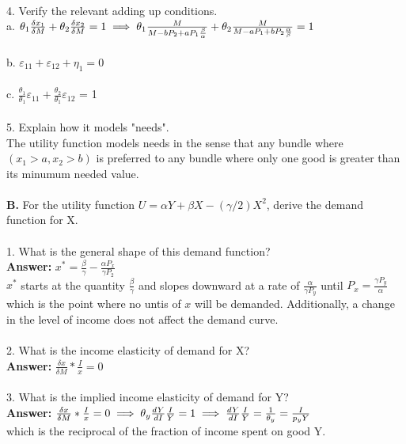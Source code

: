\documentclass[11pt]{article}
\begin{document}
\\
4. Verify the relevant adding up conditions.\\
a. $\theta_1\frac{\delta x_1}{\delta M} + \theta_2\frac{\delta x_2}{\delta M} = 1\\
\implies \theta_1\frac{M}{M - bP_2 + aP_1\frac{\beta}{\alpha}} + \theta_2\frac{M}{M - aP_1 + bP_2\frac{\alpha}{\beta}} = 1$\\
\\
b. $\varepsilon_11 + \varepsilon_12 + \eta_1 = 0$\\
\\
c. $\frac{\theta_1}{\theta_1}\varepsilon_11 + \frac{\theta_2}{\theta_1}\varepsilon_12$ = 1\\
\\
5. Explain how it models "needs".\\
The utility function models needs in the sense that any bundle where $(x_1 > a, x_2 > b)$ is preferred to any bundle where only one good is greater than its minumum needed value.\\
\\
\textbf{B. }For the utility function $U = \alpha Y + \beta X - (\gamma /2)X^2$, derive the demand function for X.\\
\\
1. What is the general shape of this demand function?\\
\textbf{Answer: } $x^* = \frac{\beta}{\gamma} - \frac{\alpha P_x}{\gamma P_2}$\\
$x^*$ starts at the quantity $\frac{\beta}{\gamma}$ and slopes downward at a rate of $\frac{\alpha}{\gamma P_y}$ until $P_x = \frac{\gamma P_y}{\alpha}$ which is the point where no untis of $x$ will be demanded. Additionally, a change in the level of income does not affect the demand curve.\\
\\
2. What is the income elasticity of demand for X?\\
\textbf{Answer: }$\frac{\delta x}{\delta M}*\frac{I}{x} = 0$\\
\\
3. What is the implied income elasticity of demand for Y?\\
\textbf{Answer: }$\frac{\delta x}{\delta M}*\frac{I}{x} = 0\\
\implies \theta_y\frac{dY}{dI}\frac{I}{Y} = 1\\
\implies \frac{dY}{dI}\frac{I}{Y} = \frac{1}{\theta_y} = \frac{I}{p_yY}$\\
which is the reciprocal of the fraction of income spent on good Y.\\
\end{document}
